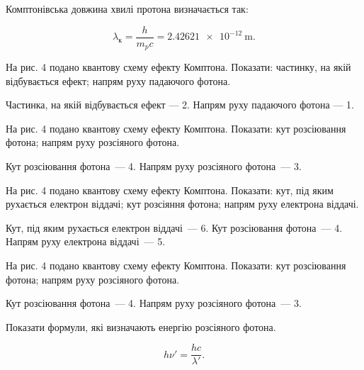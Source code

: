 \documentclass[a4paper,oneside,DIV=12,12pt]{scrartcl}
\begin{document}
	\begin{exercise}
		Комптонівська довжина хвилі протона визначається так:
	\end{exercise}
	\begin{solution}
		\[
			\lambda_{\text{к}}
			= \frac{h}{m_p c}
			= \SI{2,42621e-12}{\metre}.
		\]
	\end{solution}
	
	\begin{exercise}
		На рис. 4 подано квантову схему ефекту Комптона. Показати: частинку, на якій відбувається ефект; напрям руху падаючого фотона.
	\end{exercise}
	\begin{solution}
		Частинка, на якій відбувається ефект — 2. Напрям руху падаючого фотона — 1.
	\end{solution}
	
	\begin{exercise}
		На рис. 4 подано квантову схему ефекту Комптона. Показати: кут розсіювання фотона; напрям руху розсіяного фотона.
	\end{exercise}
	\begin{solution}
		Кут розсіювання фотона~— 4. Напрям руху розсіяного фотона~— 3.
	\end{solution}
	
	\begin{exercise}
		На рис. 4 подано квантову схему ефекту Комптона. Показати: кут, під яким рухається електрон віддачі; кут розсіяння фотона; напрям руху електрона віддачі.
	\end{exercise}
	\begin{solution}
		Кут, під яким рухається електрон віддачі~— 6. Кут розсіювання фотона~— 4. Напрям руху електрона віддачі~— 5.
	\end{solution}
	
	\begin{exercise}
		На рис. 4 подано квантову схему ефекту Комптона. Показати: кут розсіювання фотона; напрям руху розсіяного фотона.
	\end{exercise}
	\begin{solution}
		Кут розсіювання фотона~— 4. Напрям руху розсіяного фотона~— 3.
	\end{solution}
	
	\begin{exercise}
		Показати формули, які визначають енергію розсіяного фотона.
	\end{exercise}
	\begin{solution}
		\[
			h \nu' = \frac{hc}{\lambda'}.
		\]
	\end{solution}
	
\end{document}
